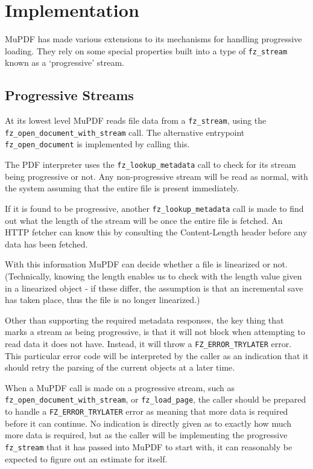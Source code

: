 \documentclass[oneside]{book}
\begin{document}
\section{Implementation}

MuPDF has made various extensions to its mechanisms for handling
progressive loading. They rely on some special properties built into a type of \texttt{fz\_stream} known as a `progressive' stream.

\subsection{Progressive Streams}

At its lowest level MuPDF reads file data from a \texttt{fz\_stream}, using the \texttt{fz\_open\_document\_with\_stream} call. The alternative entrypoint \texttt{fz\_open\_document} is implemented by calling this.

The PDF interpreter uses the \texttt{fz\_lookup\_metadata} call to check for its stream being progressive or not. Any non-progressive stream will be read as normal, with the system assuming that the entire file is present immediately.

If it is found to be progressive, another \texttt{fz\_lookup\_metadata} call is made to find out what the length of the stream will be once the  entire file is fetched. An HTTP fetcher can know this by consulting the Content-Length header before any data has been fetched.

With this information MuPDF can decide whether a file is linearized or not. (Technically, knowing the length enables us to check with the length value given in a linearized object - if these differ, the assumption is that an incremental save has taken place, thus the file is no longer linearized.)

Other than supporting the required metadata responses, the key thing that marks a stream as being progressive, is that it will not block when attempting to read data it does not have. Instead, it will throw a \texttt{FZ\_ERROR\_TRYLATER} error. This particular error code will be interpreted by the caller as an indication that it should retry the parsing of the current objects at a later time.

When a MuPDF call is made on a progressive stream, such as \texttt{fz\_open\_document\_with\_stream}, or \texttt{fz\_load\_page}, the caller should be prepared to handle a \texttt{FZ\_ERROR\_TRYLATER} error as meaning that more data is required before it can continue. No indication is directly given as to exactly how much more data is required, but as the caller will be implementing the progressive \texttt{fz\_stream} that it has passed into MuPDF to start with, it can reasonably be expected to figure out an estimate for itself.
\end{document}
